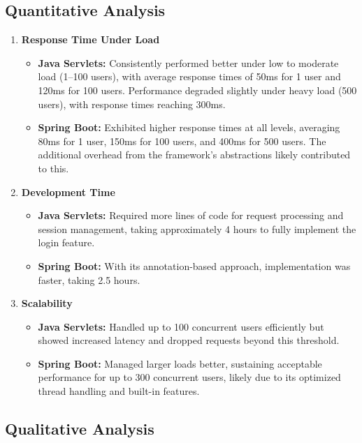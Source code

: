 \subsection{Quantitative Analysis}

\begin{enumerate}
    \item \textbf{Response Time Under Load}
    \begin{itemize}
        \item \textbf{Java Servlets:} Consistently performed better under low to moderate load (1--100 users), with average response times of 50ms for 1 user and 120ms for 100 users. Performance degraded slightly under heavy load (500 users), with response times reaching 300ms.
        \item \textbf{Spring Boot:} Exhibited higher response times at all levels, averaging 80ms for 1 user, 150ms for 100 users, and 400ms for 500 users. The additional overhead from the framework's abstractions likely contributed to this.
    \end{itemize}

    \item \textbf{Development Time}
    \begin{itemize}
        \item \textbf{Java Servlets:} Required more lines of code for request processing and session management, taking approximately 4 hours to fully implement the login feature.
        \item \textbf{Spring Boot:} With its annotation-based approach, implementation was faster, taking 2.5 hours.
    \end{itemize}

    \item \textbf{Scalability}
    \begin{itemize}
        \item \textbf{Java Servlets:} Handled up to 100 concurrent users efficiently but showed increased latency and dropped requests beyond this threshold.
        \item \textbf{Spring Boot:} Managed larger loads better, sustaining acceptable performance for up to 300 concurrent users, likely due to its optimized thread handling and built-in features.
    \end{itemize}
\end{enumerate}

\subsection{Qualitative Analysis}

